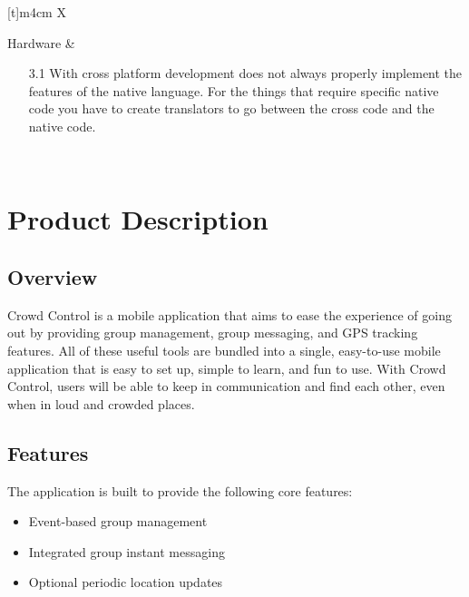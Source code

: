 \begin{center}
\begin{tabularx}{\textwidth}[t]{m{4cm} X}
\hline
{} \\
\hline

Hardware &
\begin{minipage}[t]{\linewidth}%
\begin{itemize}
\item[3.1] With cross platform development does not always properly implement the features of the
native language. For the things that require specific native code you have to create translators to go
between the cross code and the native code.
\end{itemize} 
\end{minipage}\\

\end{tabularx}
\end{center}



\section{Product Description}

\subsection{Overview}

Crowd Control is a mobile application that aims to ease the experience of going out by providing group
management, group messaging, and GPS tracking features. All of these useful tools are bundled into a
single, easy-to-use mobile application that is easy to set up, simple to learn, and fun to use. With Crowd
Control, users will be able to keep in communication and find each other, even when in loud and
crowded places.

\subsection{Features}

The application is built to provide the following core features:

\begin{itemize}
\item Event-based group management
\item Integrated group instant messaging
\item Optional periodic location updates
\end{itemize}

